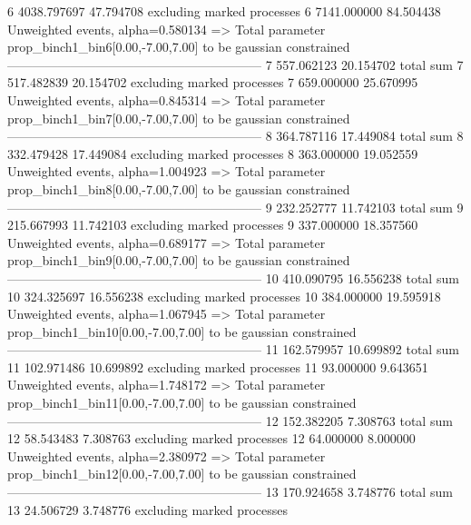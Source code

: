 6          4038.797697     47.794708       excluding marked processes    
6          7141.000000     84.504438       Unweighted events, alpha=0.580134
  => Total parameter prop_binch1_bin6[0.00,-7.00,7.00] to be gaussian constrained
------------------------------------------------------------
7          557.062123      20.154702       total sum                     
7          517.482839      20.154702       excluding marked processes    
7          659.000000      25.670995       Unweighted events, alpha=0.845314
  => Total parameter prop_binch1_bin7[0.00,-7.00,7.00] to be gaussian constrained
------------------------------------------------------------
8          364.787116      17.449084       total sum                     
8          332.479428      17.449084       excluding marked processes    
8          363.000000      19.052559       Unweighted events, alpha=1.004923
  => Total parameter prop_binch1_bin8[0.00,-7.00,7.00] to be gaussian constrained
------------------------------------------------------------
9          232.252777      11.742103       total sum                     
9          215.667993      11.742103       excluding marked processes    
9          337.000000      18.357560       Unweighted events, alpha=0.689177
  => Total parameter prop_binch1_bin9[0.00,-7.00,7.00] to be gaussian constrained
------------------------------------------------------------
10         410.090795      16.556238       total sum                     
10         324.325697      16.556238       excluding marked processes    
10         384.000000      19.595918       Unweighted events, alpha=1.067945
  => Total parameter prop_binch1_bin10[0.00,-7.00,7.00] to be gaussian constrained
------------------------------------------------------------
11         162.579957      10.699892       total sum                     
11         102.971486      10.699892       excluding marked processes    
11         93.000000       9.643651        Unweighted events, alpha=1.748172
  => Total parameter prop_binch1_bin11[0.00,-7.00,7.00] to be gaussian constrained
------------------------------------------------------------
12         152.382205      7.308763        total sum                     
12         58.543483       7.308763        excluding marked processes    
12         64.000000       8.000000        Unweighted events, alpha=2.380972
  => Total parameter prop_binch1_bin12[0.00,-7.00,7.00] to be gaussian constrained
------------------------------------------------------------
13         170.924658      3.748776        total sum                     
13         24.506729       3.748776        excluding marked processes    
